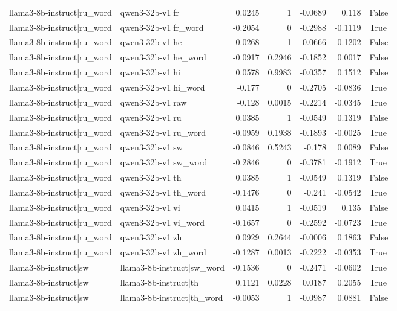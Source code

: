 \begin{table}
\begin{tabular}{l l r r r r l}
llama3-8b-instruct|ru_word & qwen3-32b-v1|fr & 0.0245 & 1 & -0.0689 & 0.118 & False \\
llama3-8b-instruct|ru_word & qwen3-32b-v1|fr_word & -0.2054 & 0 & -0.2988 & -0.1119 & True \\
llama3-8b-instruct|ru_word & qwen3-32b-v1|he & 0.0268 & 1 & -0.0666 & 0.1202 & False \\
llama3-8b-instruct|ru_word & qwen3-32b-v1|he_word & -0.0917 & 0.2946 & -0.1852 & 0.0017 & False \\
llama3-8b-instruct|ru_word & qwen3-32b-v1|hi & 0.0578 & 0.9983 & -0.0357 & 0.1512 & False \\
llama3-8b-instruct|ru_word & qwen3-32b-v1|hi_word & -0.177 & 0 & -0.2705 & -0.0836 & True \\
llama3-8b-instruct|ru_word & qwen3-32b-v1|raw & -0.128 & 0.0015 & -0.2214 & -0.0345 & True \\
llama3-8b-instruct|ru_word & qwen3-32b-v1|ru & 0.0385 & 1 & -0.0549 & 0.1319 & False \\
llama3-8b-instruct|ru_word & qwen3-32b-v1|ru_word & -0.0959 & 0.1938 & -0.1893 & -0.0025 & True \\
llama3-8b-instruct|ru_word & qwen3-32b-v1|sw & -0.0846 & 0.5243 & -0.178 & 0.0089 & False \\
llama3-8b-instruct|ru_word & qwen3-32b-v1|sw_word & -0.2846 & 0 & -0.3781 & -0.1912 & True \\
llama3-8b-instruct|ru_word & qwen3-32b-v1|th & 0.0385 & 1 & -0.0549 & 0.1319 & False \\
llama3-8b-instruct|ru_word & qwen3-32b-v1|th_word & -0.1476 & 0 & -0.241 & -0.0542 & True \\
llama3-8b-instruct|ru_word & qwen3-32b-v1|vi & 0.0415 & 1 & -0.0519 & 0.135 & False \\
llama3-8b-instruct|ru_word & qwen3-32b-v1|vi_word & -0.1657 & 0 & -0.2592 & -0.0723 & True \\
llama3-8b-instruct|ru_word & qwen3-32b-v1|zh & 0.0929 & 0.2644 & -0.0006 & 0.1863 & False \\
llama3-8b-instruct|ru_word & qwen3-32b-v1|zh_word & -0.1287 & 0.0013 & -0.2222 & -0.0353 & True \\
llama3-8b-instruct|sw & llama3-8b-instruct|sw_word & -0.1536 & 0 & -0.2471 & -0.0602 & True \\
llama3-8b-instruct|sw & llama3-8b-instruct|th & 0.1121 & 0.0228 & 0.0187 & 0.2055 & True \\
llama3-8b-instruct|sw & llama3-8b-instruct|th_word & -0.0053 & 1 & -0.0987 & 0.0881 & False \\

\end{tabular}
\end{table}
